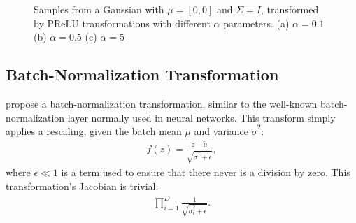 \begin{figure}[!htb]
  \begin{subfigmatrix}{3}
  \end{subfigmatrix}
    \caption{Samples from a Gaussian with $\mu = [0, 0]$ and $\Sigma = I$, transformed
    by PReLU transformations with different $\alpha$ parameters. (a) $\alpha = 0.1$
    (b) $\alpha = 0.5$ (c) $\alpha = 5$}
  \label{fig:prelu}
\end{figure}

\subsection{Batch-Normalization Transformation}
\textcite{real-nvp} propose a batch-normalization transformation, similar to
the well-known batch-normalization layer normally used in neural networks. This
transform simply applies a rescaling, given the batch mean $\tilde\mu$ and variance
${\tilde\sigma}^2$:
\begin{align}
    f(z) = \frac{z - \tilde\mu}{\sqrt{{\tilde\sigma}^2 + \epsilon}},
\end{align} where $\epsilon \ll 1$ is a term used to ensure that there never is
a division by zero. This transformation's Jacobian is trivial: 
\begin{align}
    \prod_{i=1}^D \frac{1}{\sqrt{{\tilde\sigma}_i^2 + \epsilon}}.
\end{align}

